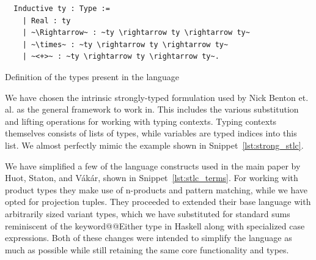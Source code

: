 \documentclass[11pt, final]{article}
\makeatletter
\def\Vakar{V\'{a}k\'{a}r}
\def\<#1>{\csname keyword@@#1\endcsname}
\makeatother
\begin{document}
\begin{listing}
  \begin{verbatim}
  Inductive ty : Type :=
    | Real : ty
    | ~\Rightarrow~ : ~ty \rightarrow ty \rightarrow ty~
    | ~\times~ : ~ty \rightarrow ty \rightarrow ty~
    | ~<+>~ : ~ty \rightarrow ty \rightarrow ty~.
  \end{verbatim}
  \caption{Definition of the types present in the language}
  \label{lst:stlc_types}
\end{listing}

We have chosen the intrinsic strongly-typed formulation used by Nick Benton et. al.\cite{Benton2011} as the general framework to work in.
This includes the various substitution and lifting operations for working with typing contexts. Typing contexts themselves consists of lists of types, while variables are typed indices into this list. We almost perfectly mimic the example shown in Snippet~\ref{lst:strong_stlc}.

We have simplified a few of the language constructs used in the main paper by Huot, Staton, and \Vakar{}\cite{huot2020correctness}, shown in Snippet~\ref{lst:stlc_terms}. For working with product types they make use of n-products and pattern matching, while we have opted for projection tuples. They proceeded to extended their base language with arbitrarily sized variant types, which we have substituted for standard sums reminiscent of the \<Either> type in Haskell along with specialized case expressions. Both of these changes were intended to simplify the language as much as possible while still retaining the same core functionality and types.
\end{document}
